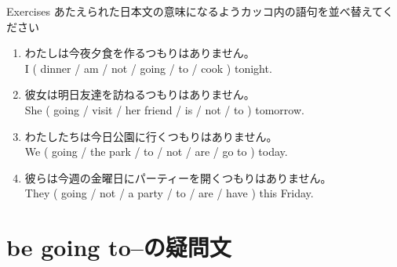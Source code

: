 \documentclass[aspectratio=169,xcolor={dvipsnames,table}]{beamer}
\newcommand{\myaudio}[1]{\href{#1}{\faVolumeUp}}
\begin{document}
\begin{frame}[plain]{Exercises}
 あたえられた日本文の意味になるようカッコ内の語句を並べ替えてください

\begin{enumerate}
 \item わたしは今夜夕食を作るつもりはありません。\\
I ( dinner / am / not / going / to / cook ) tonight.\\
\hfill{}
 \item 彼女は明日友達を訪ねるつもりはありません。\\
She ( going / visit / her friend / is / not / to ) tomorrow.\\
\hfill{}
 \item わたしたちは今日公園に行くつもりはありません。\\
We ( going / the park / to / not / are / go to ) today.\\
\hfill{}
 \item 彼らは今週の金曜日にパーティーを開くつもりはありません。\\
They ( going / not / a party / to / are / have ) this Friday.\\
\hfill{}
\end{enumerate}
\hfill\myaudio{./audio/011_be_going_to_05.mp3}
\end{frame}

\section{be going to--の疑問文}
\end{document}
